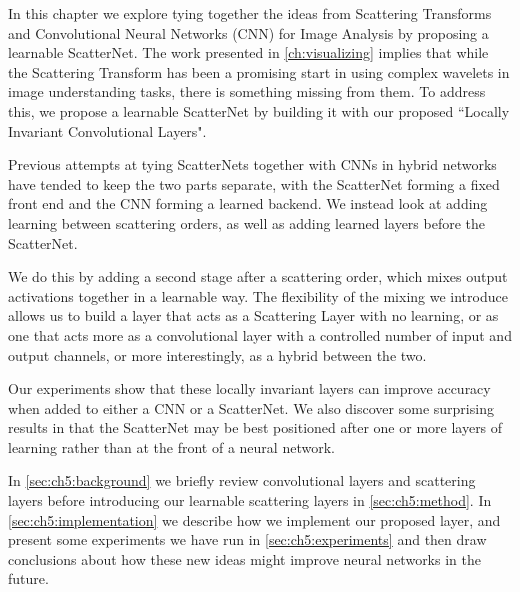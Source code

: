 In this chapter we explore tying together the ideas from Scattering Transforms
and Convolutional Neural Networks (CNN) for Image Analysis by proposing a learnable
ScatterNet. The work presented in \autoref{ch:visualizing} implies that while the Scattering 
Transform has been a promising start in using complex wavelets in image
understanding tasks, there is something missing from them. To address this, we
propose a learnable ScatterNet by building it with our proposed ``Locally Invariant
Convolutional Layers".

Previous attempts at tying ScatterNets together with CNNs in hybrid networks
\cite{oyallon_scaling_2017, oyallon_hybrid_2017, singh_scatternet_2018} have
tended to keep the two parts separate, with the ScatterNet forming a fixed front
end and the CNN forming a learned backend. We instead look at adding learning
between scattering orders, as well as adding learned layers before the
ScatterNet. 

%
We do this by adding a second stage after a scattering order, which mixes output
activations together in a learnable way. The flexibility of the mixing we introduce allows
us to build a layer that acts as a Scattering Layer with no learning, or
as one that acts more as a convolutional layer with a controlled number of input
and output channels, or more interestingly, as a hybrid between the two. 

Our experiments show that these locally invariant layers can improve
accuracy when added to either a CNN or a ScatterNet.  We also discover some
surprising results in that the ScatterNet may be best positioned after one or
more layers of learning rather than at the front of a neural network.

In \autoref{sec:ch5:background} we briefly review convolutional layers and scattering
layers before introducing our learnable scattering layers in \autoref{sec:ch5:method}.
In \autoref{sec:ch5:implementation} we describe how we implement our proposed layer,
and present some experiments we have run in \autoref{sec:ch5:experiments} and then
draw conclusions about how these new ideas might improve neural networks in the
future.
